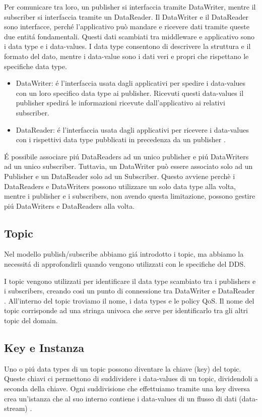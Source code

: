 Per comunicare tra loro, un publisher si interfaccia tramite
DataWriter, 
mentre il subscriber si interfaccia tramite un DataReader.
Il DataWriter e il DataReader sono interfacce, 
perché l'applicativo
può mandare e ricevere dati
tramite queste due entitá fondamentali. 
Questi dati scambiati tra middleware e applicativo
sono i data type e i data-values. I data type consentono di 
descrivere la struttura e il formato del dato, mentre i data-value
sono i dati veri e propri che rispettano le specifiche data type.
\begin{itemize}
    \item DataWriter: é l'interfaccia usata dagli applicativi 
    per spedire i
    data-values con un loro specifico data type ai publisher.
    Ricevuti questi data-values il publisher spedirá le
    informazioni ricevute dall'applicativo ai relativi subscriber.
    \item DataReader: é l'interfaccia usata dagli applicativi per
    ricevere i data-values con i rispettivi data type pubblicati in
    precedenza da un publisher \cite{dds1.4}.
\end{itemize}
É possibile
associare piú DataReaders ad un unico publisher e piú DataWriters ad
un unico subscriber. Tuttavia, un DataWriter può essere associato solo ad un 
Publisher e un DataReader solo ad un Subscriber. 
Questo avviene perchè
i DataReaders e DataWriters possono utilizzare un solo data type alla volta, 
mentre 
i publisher e i subscribers, non avendo questa limitazione, possono gestire 
piú DataWriters e DataReaders alla volta.


\subsection{Topic}
Nel modello publish/subscribe abbiamo giá introdotto i topic, ma 
abbiamo la necessitá di approfondirli quando vengono utilizzati
con le specifiche del DDS.

I topic vengono utilizzati per identificare il data type
scambiato tra i publishers e i subscribers, creando cosi un punto
di connessione 
tra DataWriter e DataReader \cite{topicomg}.
All'interno del topic troviamo il nome,
i data types e le policy QoS.
Il nome del topic corrisponde ad una stringa univoca 
che serve per identificarlo 
tra gli altri topic del domain.


\subsection{Key e Instanza}
Uno o piú data types di un topic possono diventare la chiave (key) del topic. 
Queste chiavi ci permettono di suddividere
i data-values di un topic, dividendoli a seconda della chiave.
Ogni suddivisione che effettuiamo tramite una key diversa crea 
un'istanza che al suo interno contiene i data-values di un 
flusso di dati (data-stream)
\cite{Instance81:online}.

